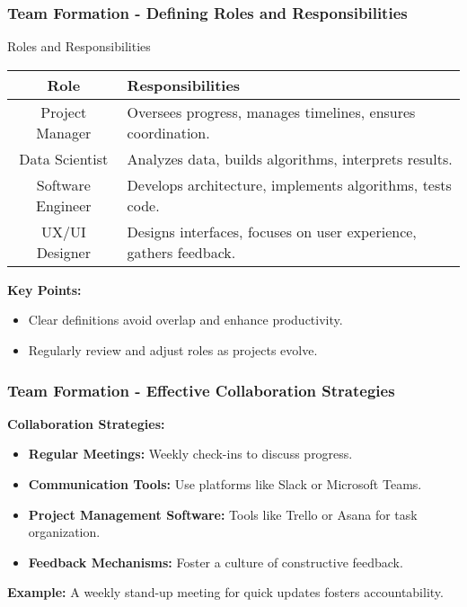 \documentclass[aspectratio=169]{beamer}
\begin{document}
\begin{frame}[fragile]
    \frametitle{Team Formation - Defining Roles and Responsibilities}
    \begin{block}{Roles and Responsibilities}
        \begin{tabular}{|c|l|}
            \hline
            \textbf{Role} & \textbf{Responsibilities} \\
            \hline
            Project Manager & Oversees progress, manages timelines, ensures coordination. \\
            \hline
            Data Scientist & Analyzes data, builds algorithms, interprets results. \\
            \hline
            Software Engineer & Develops architecture, implements algorithms, tests code. \\
            \hline
            UX/UI Designer & Designs interfaces, focuses on user experience, gathers feedback. \\
            \hline
        \end{tabular}
    \end{block}
    \textbf{Key Points:}
    \begin{itemize}
        \item Clear definitions avoid overlap and enhance productivity.
        \item Regularly review and adjust roles as projects evolve.
    \end{itemize}
\end{frame}

\begin{frame}[fragile]
    \frametitle{Team Formation - Effective Collaboration Strategies}
    \textbf{Collaboration Strategies:}
    \begin{itemize}
        \item \textbf{Regular Meetings:} Weekly check-ins to discuss progress.
        \item \textbf{Communication Tools:} Use platforms like Slack or Microsoft Teams.
        \item \textbf{Project Management Software:} Tools like Trello or Asana for task organization.
        \item \textbf{Feedback Mechanisms:} Foster a culture of constructive feedback.
    \end{itemize}
    
    \textbf{Example:} A weekly stand-up meeting for quick updates fosters accountability.
\end{frame}
\end{document}
